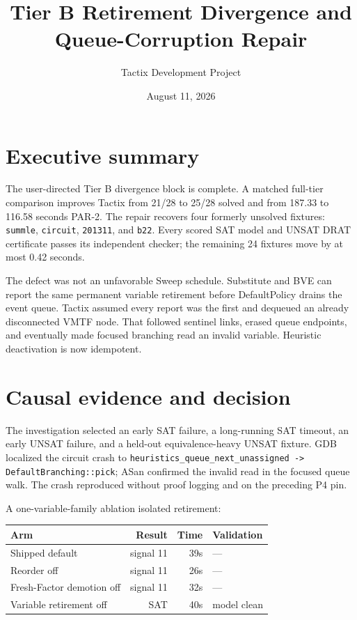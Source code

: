 \documentclass[11pt]{article}
\title{Tier B Retirement Divergence and Queue-Corruption Repair}
\author{Tactix Development Project}
\date{August 11, 2026}
\newcommand{\code}[1]{\nolinkurl{#1}}
\newcommand{\tactix}{Tactix}
\begin{document}
\maketitle
\sloppy

\section*{Executive summary}

The user-directed Tier B divergence block is complete. A matched full-tier
comparison improves \tactix{} from 21/28 to 25/28 solved and from 187.33 to
116.58 seconds PAR-2. The repair recovers four formerly unsolved fixtures:
\code{summle}, \code{circuit}, \code{201311}, and \code{b22}. Every scored SAT
model and UNSAT DRAT certificate passes its independent checker; the remaining
24 fixtures move by at most 0.42 seconds.

The defect was not an unfavorable Sweep schedule. Substitute and BVE can
report the same permanent variable retirement before DefaultPolicy drains the
event queue. \tactix{} assumed every report was the first and dequeued an
already disconnected VMTF node. That followed sentinel links, erased queue
endpoints, and eventually made focused branching read an invalid variable.
Heuristic deactivation is now idempotent.

\section{Causal evidence and decision}

The investigation selected an early SAT failure, a long-running SAT timeout,
an early UNSAT failure, and a held-out equivalence-heavy UNSAT fixture. GDB
localized the circuit crash to
\code{heuristics_queue_next_unassigned -> DefaultBranching::pick}; ASan
confirmed the invalid read in the focused queue walk. The crash reproduced
without proof logging and on the preceding P4 pin.

A one-variable-family ablation isolated retirement:

\begin{center}
\begin{tabular}{lrrl}
\toprule
Arm & Result & Time & Validation \\
\midrule
Shipped default & signal 11 & 39s & --- \\
Reorder off & signal 11 & 26s & --- \\
Fresh-Factor demotion off & signal 11 & 32s & --- \\
Variable retirement off & SAT & 40s & model clean \\
\bottomrule
\end{tabular}
\end{center}
\end{document}
